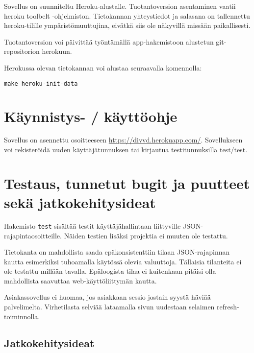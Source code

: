 \documentclass[a4paper,parskip=half]{scrartcl}
\begin{document}
Sovellus on suunniteltu Heroku-alustalle. Tuotantoversion asentaminen
vaatii heroku toolbelt -ohjelmiston. Tietokannan yhteystiedot ja salasana
on tallennettu heroku-tilille ympäristömuuttujina, eivätkä siis ole näkyvillä
missään paikallisesti.

Tuotantoversion voi päivittää työntämällä app-hakemistoon alustetun
git-repositorion herokuun.

Herokussa olevan tietokannan voi alustaa seuraavalla komennolla:
\begin{Verbatim}
make heroku-init-data
\end{Verbatim}

\section{Käynnistys- / käyttöohje}
Sovellus on asennettu osoitteeseen \url{https://divvd.herokuapp.com/}.
Sovellukseen voi rekisteröidä uuden käyttäjätunnuksen tai kirjautua
testitunnuksilla test/test.

\section{Testaus, tunnetut bugit ja puutteet sekä jatkokehitysideat}

Hakemisto \texttt{test} sisältää testit käyttäjähallintaan liittyville
JSON-rajapintaosoitteille. Näiden testien lisäksi projektia ei muuten
ole testattu.

Tietokanta on mahdollista saada epäkonsistenttiin tilaan JSON-rajapinnan
kautta esimerkiksi tuhoamalla käytössä olevia valuuttoja. Tällaisia tilanteita
ei ole testattu millään tavalla. Epäloogista tilaa ei kuitenkaan pitäisi olla
mahdollista saavuttaa web-käyttöliittymän kautta.

Asiakassovellus ei huomaa, jos asiakkaan sessio jostain syystä häviää
palvelimelta. Virhetilasta selviää lataamalla sivun uudestaan selaimen
refresh-toiminnolla.

\subsection{Jatkokehitysideat}
\end{document}

